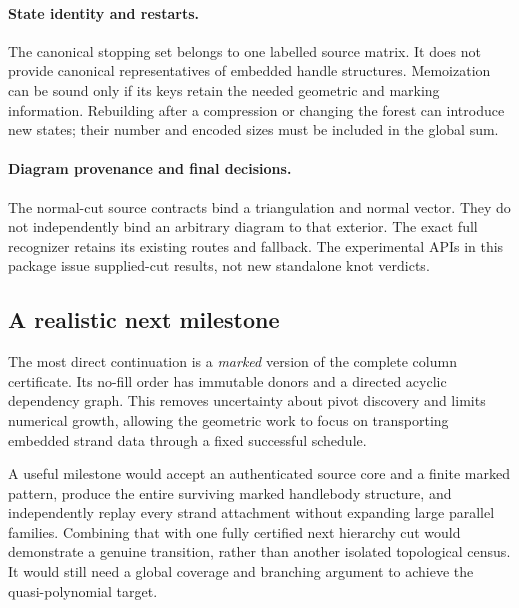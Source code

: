 \paragraph{State identity and restarts.}
The canonical stopping set belongs to one labelled source matrix.
It does not provide canonical representatives of embedded handle
structures. Memoization can be sound only if its keys retain the
needed geometric and marking information. Rebuilding after a
compression or changing the forest can introduce new states; their
number and encoded sizes must be included in the global sum.

\paragraph{Diagram provenance and final decisions.}
The normal-cut source contracts bind a triangulation and normal vector.
They do not independently bind an arbitrary diagram to that exterior.
The exact full recognizer retains its existing routes and fallback.
The experimental APIs in this package issue supplied-cut results, not
new standalone knot verdicts.

\subsection{A realistic next milestone}

The most direct continuation is a \emph{marked} version of the complete
column certificate. Its no-fill order has immutable donors and a directed
acyclic dependency graph. This removes uncertainty about pivot discovery
and limits numerical growth, allowing the geometric work to focus on
transporting embedded strand data through a fixed successful schedule.

A useful milestone would accept an authenticated source core and a finite
marked pattern, produce the entire surviving marked handlebody structure,
and independently replay every strand attachment without expanding large
parallel families. Combining that with one fully certified next hierarchy
cut would demonstrate a genuine transition, rather than another isolated
topological census. It would still need a global coverage and branching
argument to achieve the quasi-polynomial target.
